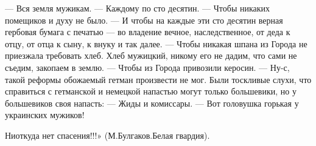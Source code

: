 \obeycr
— Вся земля мужикам.
— Каждому по сто десятин.
— Чтобы никаких помещиков и духу не было.
— И чтобы на каждые эти сто десятин верная гербовая бумага с печатью — во владение вечное, наследственное, от деда к отцу, от отца к сыну, к внуку и так далее.
— Чтобы никакая шпана из Города не приезжала требовать хлеб. Хлеб мужицкий, никому его не дадим, что сами не съедим, закопаем в землю.
— Чтобы из Города привозили керосин.
— Ну-с, такой реформы обожаемый гетман произвести не мог.
Были тоскливые слухи, что справиться с гетманской и немецкой напастью могут только большевики, но у большевиков своя напасть:
— Жиды и комиссары.
— Вот головушка горькая у украинских мужиков!
\restorecr

Ниоткуда нет спасения!!!» (М.Булгаков.Белая гвардия).

